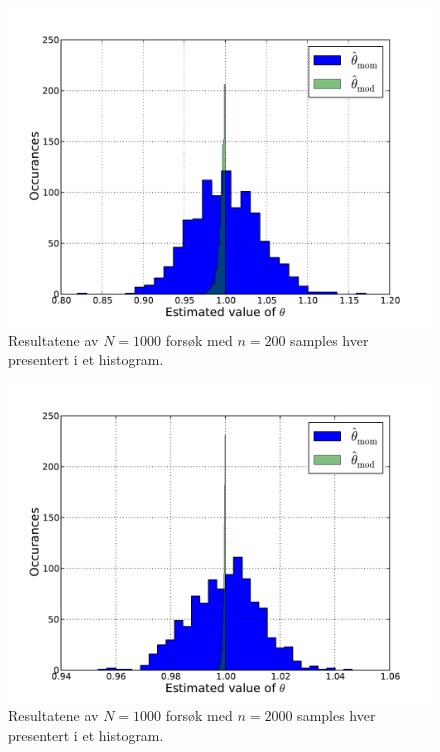 \documentclass[a4paper, 11pt, titlepage, english]{article}
\begin{document}
\begin{figure}
\centering
\includegraphics[width=\textwidth]{estimators_hist_n200.pdf}
\caption{Resultatene av $N=1000$ forsøk med $n=200$ samples hver presentert i et histogram. \label{fig:hist2}}
\end{figure}

\begin{figure}[t]
\centering
\includegraphics[width=\textwidth]{estimators_hist_n2000.pdf}
\caption{Resultatene av $N=1000$ forsøk med $n=2000$ samples hver presentert i et histogram. \label{fig:hist3}}
\end{figure}

\clearpage
\end{document}
